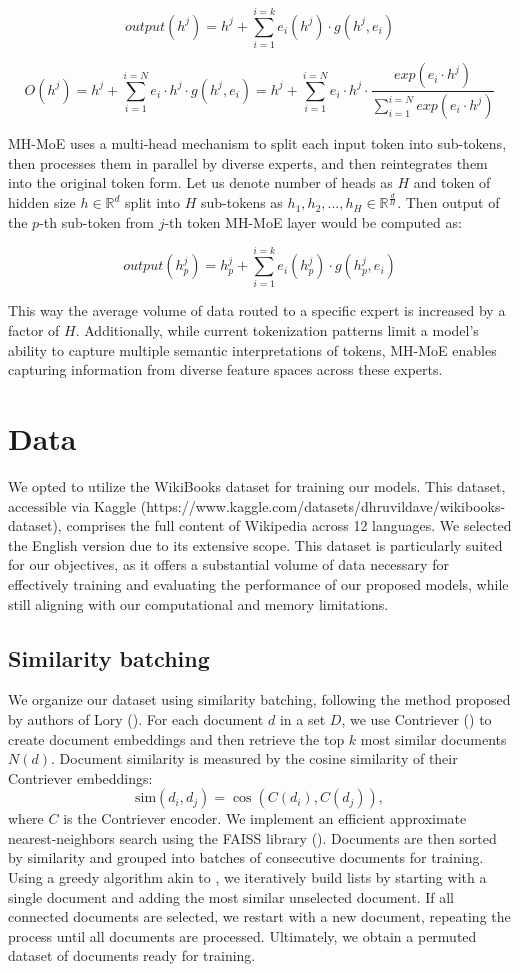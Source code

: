 \documentclass[12pt]{article}
\begin{document}
\[ output(h^j)=h^j+\sum_{i=1}^{i=k} e_i (h^j)  \cdot g(h^j, e_i)\]

 \[ O(h^j)=h^j+\sum_{i=1}^{i=N} e_i \cdot h^j  \cdot g(h^j, e_i)= h^j + \sum_{i=1}^{i=N} e_i \cdot h^j  \cdot \frac{exp( e_i \cdot h^j)}{\sum_{i=1}^{i=N} exp(e_i \cdot h^j)}\]

MH-MoE uses a multi-head mechanism to split each input token into sub-tokens, then processes them in parallel by diverse experts, and then reintegrates them into the original token form. Let us denote number of heads as $H$ and token of hidden size $h \in \mathbb{R}^d $ split into $H$ sub-tokens as $h_1,h_2,...,h_H \in \mathbb{R}^{\frac{d}{H}} $. Then output of the $p$-th sub-token from $j$-th token MH-MoE layer would be computed as:

\[ output(h_p^j)= h_p^j + \sum_{i=1}^{i=k} e_i (h_p^j)  \cdot g(h_p^j,e_i)\]


This way the average volume of data routed to a specific expert is increased by a factor of $H$.
Additionally, while current tokenization patterns limit a model's ability to capture multiple semantic interpretations of tokens, MH-MoE enables capturing information from diverse feature spaces across these experts.

\section{Data}
We opted to utilize the WikiBooks dataset for training our models. This dataset, accessible via Kaggle (https://www.kaggle.com/datasets/dhruvildave/wikibooks-dataset), comprises the full content of Wikipedia across 12 languages. We selected the English version due to its extensive scope. This dataset is particularly suited for our objectives, as it offers a substantial volume of data necessary for effectively training and evaluating the performance of our proposed models, while still aligning with our computational and memory limitations.


\subsection{Similarity batching}
We organize our dataset using similarity batching, following the method proposed by authors of Lory (\cite{zhong2024lory}). For each document \( d \) in a set \( D \), we use Contriever (\cite{izacard2022unsupervised}) to create document embeddings and then retrieve the top \( k \) most similar documents \( N(d) \). Document similarity is measured by the cosine similarity of their Contriever embeddings: 
\[
\text{sim}(d_i, d_j) = \cos(C(d_i), C(d_j)),
\]
where \( C \) is the Contriever encoder. We implement an efficient approximate nearest-neighbors search using the FAISS library (\cite{johnson2019billion}). Documents are then sorted by similarity and grouped into batches of consecutive documents for training. Using a greedy algorithm akin to \cite{shi2023context}, we iteratively build lists by starting with a single document and adding the most similar unselected document. If all connected documents are selected, we restart with a new document, repeating the process until all documents are processed. Ultimately, we obtain a permuted dataset of documents ready for training.
\end{document}
